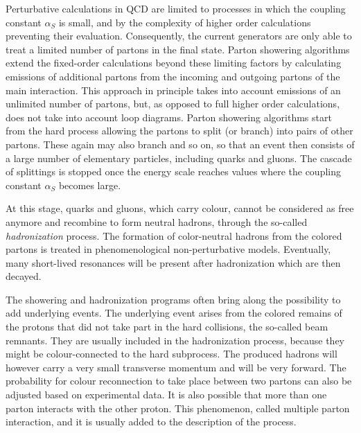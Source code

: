 Perturbative calculations in QCD are limited to processes in which the coupling constant $\alpha_S$ is small, and by the complexity of higher order calculations preventing their evaluation.
Consequently, the current generators are only able to treat a limited number of partons in the final state. 
Parton showering algorithms extend the fixed-order calculations beyond these limiting factors by calculating emissions of additional partons from the incoming and outgoing partons of the main interaction.
This approach in principle takes into account emissions of an unlimited number of partons, but, as opposed to full higher order calculations, does not take into account loop diagrams.
Parton showering algorithms start from the hard process allowing the partons to split (or branch) into pairs of other partons.
These again may also branch and so on, so that an event then consists of a large number of elementary particles, including quarks and gluons.
The cascade of splittings is stopped once the energy scale reaches values where the coupling constant $\alpha_S$ becomes large.

At this stage, quarks and gluons, which carry colour, cannot be considered as free anymore and recombine to form neutral hadrons, through the so-called \textit{hadronization} process.
The formation of color-neutral hadrons from the colored partons is treated in phenomenological non-perturbative models.
Eventually, many short-lived resonances will be present after hadronization which are then decayed.

The showering and hadronization programs often bring along the possibility to add underlying events. The underlying event arises from the colored remains of the protons that did not take part in the hard collisions, the so-called beam remnants.
They are usually included in the hadronization process, because they might be colour-connected to the hard subprocess. The produced hadrons will however carry a very small transverse momentum and will be very forward.
The probability for colour reconnection to take place between two partons can also be adjusted based on experimental data. %
It is also possible that more than one parton interacts with the other proton. This phenomenon, called multiple parton interaction, and it is usually added to the description of the process.\\

